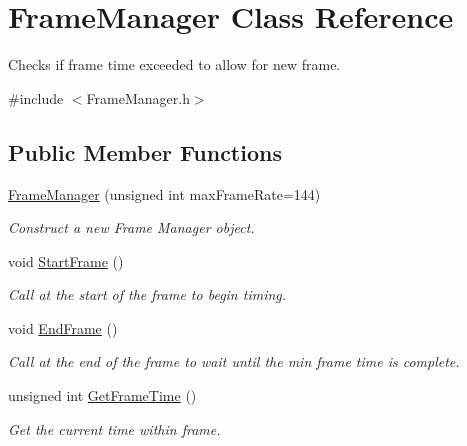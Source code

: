 \hypertarget{classFrameManager}{}\section{Frame\+Manager Class Reference}
\label{classFrameManager}


Checks if frame time exceeded to allow for new frame.  




{\ttfamily \#include $<$Frame\+Manager.\+h$>$}

\subsection*{Public Member Functions}
\begin{DoxyCompactItemize}
\item 
\hyperlink{classFrameManager_a3f1810bcec4dc3118e55e1b1c1cd6197}{Frame\+Manager} (unsigned int max\+Frame\+Rate=144)
\begin{DoxyCompactList}\small\item\em Construct a new Frame Manager object. \end{DoxyCompactList}\item 
\mbox{\label{classFrameManager_a8269f9bd88d259ba6a375439d264169d}} 
void \hyperlink{classFrameManager_a8269f9bd88d259ba6a375439d264169d}{Start\+Frame} ()
\begin{DoxyCompactList}\small\item\em Call at the start of the frame to begin timing. \end{DoxyCompactList}\item 
\mbox{\label{classFrameManager_a7e5cb5d2601fcc29337f31a76c306ece}} 
void \hyperlink{classFrameManager_a7e5cb5d2601fcc29337f31a76c306ece}{End\+Frame} ()
\begin{DoxyCompactList}\small\item\em Call at the end of the frame to wait until the min frame time is complete. \end{DoxyCompactList}\item 
unsigned int \hyperlink{classFrameManager_a18adc31d8edea896cabd539ae87a0b6d}{Get\+Frame\+Time} ()
\begin{DoxyCompactList}\small\item\em Get the current time within frame. \end{DoxyCompactList}\item 

\end{DoxyCompactItemize}
